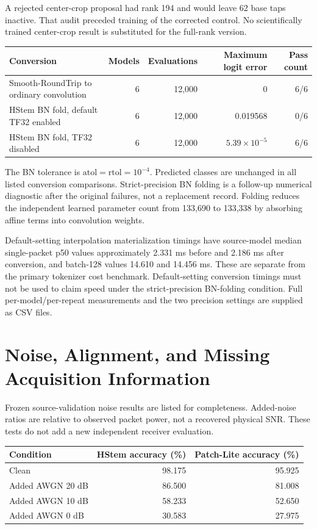 \documentclass[11pt]{article}
\begin{document}
A rejected center-crop proposal had rank 194 and would leave 62 base taps inactive. That audit preceded training of the corrected control. No scientifically trained center-crop result is substituted for the full-rank version.

\begin{center}
\begin{tabular}{p{6.3cm}rrrr}\toprule
Conversion & Models & Evaluations & Maximum logit error & Pass count\\\midrule
Smooth-RoundTrip to ordinary convolution & 6 & 12,000 & 0 & 6/6\\
HStem BN fold, default TF32 enabled & 6 & 12,000 & 0.019568 & 0/6\\
HStem BN fold, TF32 disabled & 6 & 12,000 & $5.39\times10^{-5}$ & 6/6\\\bottomrule
\end{tabular}
\end{center}

The BN tolerance is $\mathrm{atol}=\mathrm{rtol}=10^{-4}$. Predicted classes are unchanged in all listed conversion comparisons. Strict-precision BN folding is a follow-up numerical diagnostic after the original failures, not a replacement record. Folding reduces the independent learned parameter count from 133,690 to 133,338 by absorbing affine terms into convolution weights.

Default-setting interpolation materialization timings have source-model median single-packet p50 values approximately 2.331 ms before and 2.186 ms after conversion, and batch-128 values 14.610 and 14.456 ms. These are separate from the primary tokenizer cost benchmark. Default-setting conversion timings must not be used to claim speed under the strict-precision BN-folding condition. Full per-model/per-repeat measurements and the two precision settings are supplied as CSV files.

\section{Noise, Alignment, and Missing Acquisition Information}
Frozen source-validation noise results are listed for completeness. Added-noise ratios are relative to observed packet power, not a recovered physical SNR. These tests do not add a new independent receiver evaluation.

\begin{center}
\begin{tabular}{lrr}\toprule
Condition & HStem accuracy (\%) & Patch-Lite accuracy (\%)\\\midrule
Clean & 98.175 & 95.925\\
Added AWGN 20 dB & 86.500 & 81.008\\
Added AWGN 10 dB & 58.233 & 52.650\\
Added AWGN 0 dB & 30.583 & 27.975\\\bottomrule
\end{tabular}
\end{center}
\end{document}
